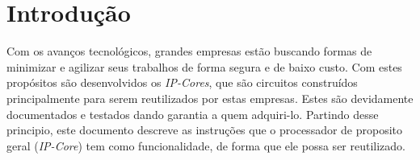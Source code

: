 \section{Introdução}
Com os avanços tecnológicos, grandes empresas estão buscando formas de minimizar e agilizar seus trabalhos de forma segura e de baixo custo. Com estes propósitos são desenvolvidos os \textit{IP-Cores}, que são circuitos construídos principalmente para serem reutilizados por estas empresas. Estes são devidamente documentados e testados dando garantia a quem adquiri-lo. Partindo desse principio, este documento descreve as instruções que o processador de proposito geral (\textit{IP-Core}) tem como funcionalidade, de forma que ele possa ser reutilizado.